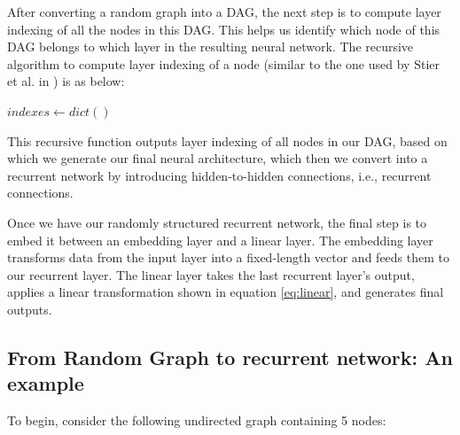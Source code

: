 After converting a random graph into a DAG, the next step is to compute layer indexing of all the nodes in this DAG. This helps us identify which node of this DAG belongs to which layer in the resulting neural network. The recursive algorithm to compute layer indexing of a node (similar to the one used by Stier et al. in \cite{julian}) is as below:

\begin{algorithm}
  \DontPrintSemicolon
  \caption[Compute layer indexing of nodes]%
  {Recursive function to compute layer indexing of nodes}
  \label{alg:layer_index}
  
  
    
    
    $indexes \gets dict()$ 
\end{algorithm}

This recursive function outputs layer indexing of all nodes in our DAG, based on which we generate our final neural architecture, which then we convert into a recurrent network by introducing hidden-to-hidden connections, i.e., recurrent connections.

Once we have our randomly structured recurrent network, the final step is to embed it between an embedding layer and a linear layer. The embedding layer transforms data from the input layer into a fixed-length vector and feeds them to our recurrent layer. The linear layer takes the last recurrent layer's output, applies a linear transformation shown in equation \ref{eq:linear}, and generates final outputs.

\subsection{From Random Graph to recurrent network: An example}

To begin, consider the following undirected graph containing 5 nodes:

